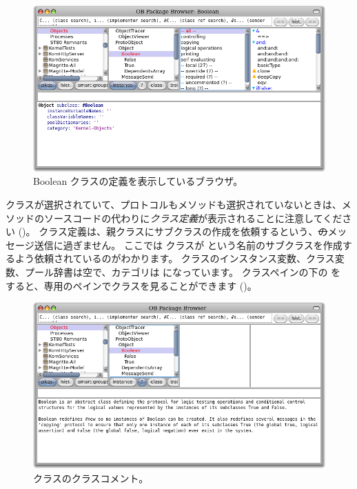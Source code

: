 \documentclass[a4paper,10pt,twoside]{book}
\begin{document}

\begin{figure}[hbt]
\centerline {\includegraphics[width=\textwidth]{Kernel-objects-boolean}}
\caption{Boolean クラスの定義を表示しているブラウザ。
}
\end{figure}

 クラスが選択されていて、プロトコルもメソッドも選択されていないときは、メソッドのソースコードの代わりに\emph{クラス定義}が表示されることに注意してください ()。
クラス定義は、親クラスにサブクラスの作成を依頼するという、\st のメッセージ送信に過ぎません。
ここでは  クラスが  という名前のサブクラスを作成するよう依頼されているのがわかります。 クラスのインスタンス変数、クラス変数、プール辞書は空で、カテゴリは になっています。
クラスペインの下の  を \click すると、専用のペインでクラスを見ることができます ()。

\begin{figure}[hbt]
\centerline {\includegraphics[width=\textwidth]{classComment}}
\caption{ クラスのクラスコメント。
}
\end{figure}
\end{document}
